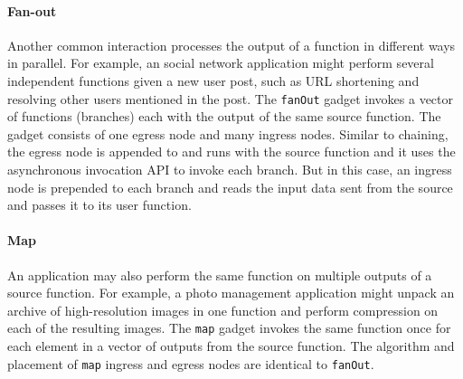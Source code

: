 \paragraph{Fan-out}
Another common interaction processes the output of a function in different
ways in parallel. For example, an social network application might perform
several independent functions given a new user post, such as URL shortening
and resolving other users mentioned in the post. The \texttt{fanOut} gadget
invokes a vector of functions (branches) each with the output of the same
source function. The gadget consists of one egress node and many ingress
nodes. Similar to chaining, the egress node is appended to and runs with the
source function and it uses the asynchronous invocation API to invoke each
branch. But in this case, an ingress node is prepended to each branch and
reads the input data sent from the source and passes it to its user function.

\paragraph{Map}
An application may also perform the same function on multiple outputs of a
source function. For example, a photo management application might unpack an
archive of high-resolution images in one function and perform compression on
each of the resulting images. The \texttt{map} gadget invokes the same
function once for each element in a vector of outputs from the source
function. The algorithm and placement of \texttt{map} ingress and egress nodes
are identical to \texttt{fanOut}.


